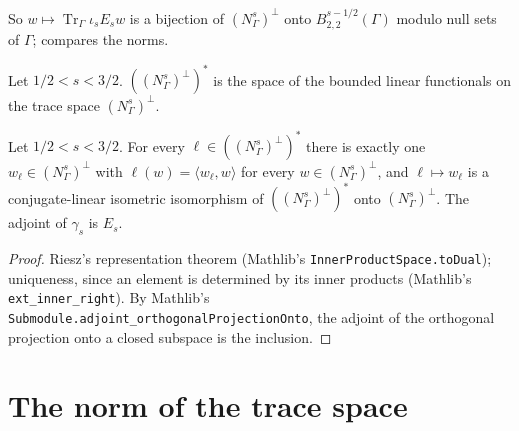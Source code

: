 So $w \mapsto \operatorname{Tr}_\Gamma \iota_s E_s w$ is a bijection of $(N^s_\Gamma)^\perp$ onto
$B^{s-1/2}_{2,2}(\Gamma)$ modulo null sets of $\Gamma$;  compares the
norms.

\begin{definition}
\label{def:dual-trace-space}
\leanok
{}
Let $1/2 < s < 3/2$. $((N^s_\Gamma)^\perp)^*$ is the space of the bounded linear functionals on
the trace space $(N^s_\Gamma)^\perp$.
\end{definition}

\begin{theorem}
\label{thm:dual-trace-space}
\leanok
{}
Let $1/2 < s < 3/2$. For every $\ell \in ((N^s_\Gamma)^\perp)^*$ there is exactly one
$w_\ell \in (N^s_\Gamma)^\perp$ with $\ell(w) = \langle w_\ell, w \rangle$ for every
$w \in (N^s_\Gamma)^\perp$, and $\ell \mapsto w_\ell$ is a conjugate-linear isometric isomorphism
of $((N^s_\Gamma)^\perp)^*$ onto $(N^s_\Gamma)^\perp$. The adjoint of $\gamma_s$ is $E_s$.
\end{theorem}

\begin{proof}
\leanok
Riesz's representation theorem (Mathlib's \texttt{InnerProductSpace.\allowbreak toDual});
uniqueness, since an element is determined by its inner products (Mathlib's
\texttt{ext\_\allowbreak inner\_\allowbreak right}). By
Mathlib's \texttt{Submodule.\allowbreak adjoint\_\allowbreak orthogonalProjectionOnto}, the adjoint
of the orthogonal projection onto a closed subspace is the inclusion.
\end{proof}

\section{The norm of the trace space}
\label{sec:trace-space-norm}

